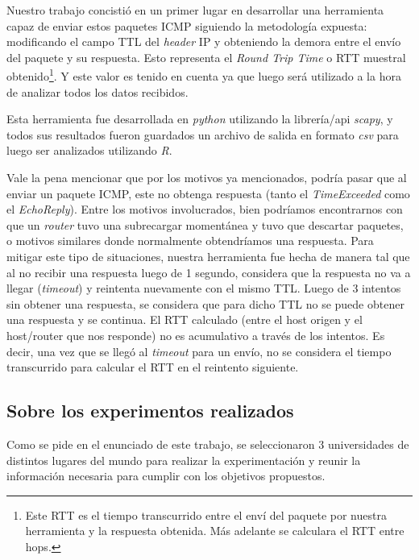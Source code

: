 \par Nuestro trabajo concisti\'o en un primer lugar en desarrollar una
herramienta capaz de enviar estos paquetes ICMP siguiendo la metodolog\'ia
expuesta: modificando el campo TTL del \textit{header} IP y obteniendo la demora
entre el env\'io del paquete y su respuesta. Esto representa el \textit{Round
Trip Time} o RTT muestral obtenido\footnote{Este RTT es el tiempo transcurrido
entre el env\'i del paquete por nuestra herramienta y la respuesta obtenida.
M\'as adelante se calculara el RTT entre hops.}. Y este valor es tenido en
cuenta ya que luego ser\'a utilizado a la hora de analizar todos los datos
recibidos.

\par Esta herramienta fue desarrollada en \textit{python}\cite{python}
utilizando la librer\'ia/api \textit{scapy}\cite{scapy}, y todos sus resultados
fueron guardados un archivo de salida en formato \textit{csv}\cite{csv} para
luego ser analizados utilizando \textit{R}\cite{R}.

\par Vale la pena mencionar que por los motivos ya mencionados, podr\'ia pasar
que al enviar un paquete ICMP, este no obtenga respuesta (tanto el \textit{%
TimeExceeded} como el \textit{EchoReply}). Entre los motivos involucrados, bien
podr\'iamos encontrarnos con que un \textit{router} tuvo una subrecargar
moment\'anea y tuvo que descartar paquetes, o motivos similares donde
normalmente obtendr\'iamos una respuesta. Para mitigar este tipo de situaciones,
nuestra herramienta fue hecha de manera tal que al no recibir una respuesta
luego de 1 segundo, considera que la respuesta no va a llegar (\textit{timeout})
y reintenta nuevamente con el mismo TTL. Luego de 3 intentos sin obtener una
respuesta, se considera que para dicho TTL no se puede obtener una respuesta
y se continua. El RTT calculado (entre el host origen y el host/router que nos
responde) no es acumulativo a trav\'es de los intentos. Es decir, una vez que
se lleg\'o al \textit{timeout} para un env\'io, no se considera el tiempo
transcurrido para calcular el RTT en el reintento siguiente.


\subsection*{Sobre los experimentos realizados}
\par Como se pide en el enunciado de este trabajo, se seleccionaron 3
universidades de distintos lugares del mundo para realizar la experimentaci\'on
y reunir la informaci\'on necesaria para cumplir con los objetivos propuestos.

